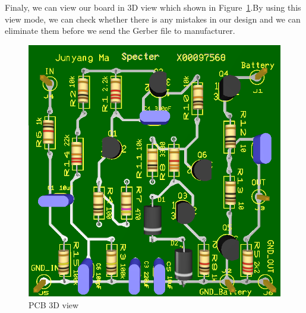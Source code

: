 Finaly, we can view our board in 3D view which shown in Figure~\ref{fig:PCB 3D view}.By using this view mode, we can check whether there is any mistakes in our design and we can eliminate them before we send the Gerber file to manufacturer.

\begin{figure}[htbp]
	\centering
	\includegraphics[scale=0.6]{"../Photo/Chap6/final PCB 3D view"}
	\caption{PCB 3D view }
	\label{fig:PCB 3D view}
\end{figure}
